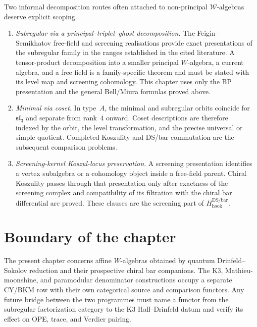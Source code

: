 \begin{remark}
\label{rem:subregular-minimal-scope}
Two informal decomposition routes often attached to non-principal
$\mathcal{W}$-algebras deserve explicit scoping.
\begin{enumerate}[label=\textup{(\roman*)}]
\item \emph{Subregular via a principal--triplet--ghost decomposition.}
The Feigin--Semikhatov free-field and screening realisations provide exact
presentations of the subregular family in the ranges established in the cited
literature.  A tensor-product decomposition into a smaller principal
$W$-algebra, a current algebra, and a free field is a family-specific theorem
and must be stated with its level map and screening cohomology.  This chapter
uses only the BP presentation and the general Bell/Miura formulas proved above.
\item \emph{Minimal via coset.}
In type~$A$, the minimal and subregular orbits coincide for
$\mathfrak{sl}_3$ and separate from rank~$4$ onward.  Coset descriptions are
therefore indexed by the orbit, the level transformation, and the precise
universal or simple quotient.  Completed Koszulity and DS/bar commutation are
the subsequent comparison problems.
\item \emph{Screening-kernel Koszul-locus preservation.}
A screening presentation identifies a vertex subalgebra or a cohomology object
inside a free-field parent.  Chiral Koszulity passes through that presentation
only after exactness of the screening complex and compatibility of its
filtration with the chiral bar differential are proved.  These clauses are the
screening part of $H_{\mathrm{hook}}^{\mathrm{DS/bar}}$.
\end{enumerate}
\end{remark}

\section{Boundary of the chapter}
\label{sec:subreg-supplement}

\begin{remark}
\label{rem:subreg-anomalous-classes}
The present chapter concerns affine $W$-algebras obtained by quantum
Drinfeld--Sokolov reduction and their prospective chiral bar companions.  The
K3, Mathieu-moonshine, and paramodular denominator constructions occupy a
separate CY/BKM row with their own categorical source and comparison functors.
Any future bridge between the two programmes must name a functor from the
subregular factorization category to the K3 Hall--Drinfeld datum and verify its
effect on OPE, trace, and Verdier pairing.
\end{remark}
